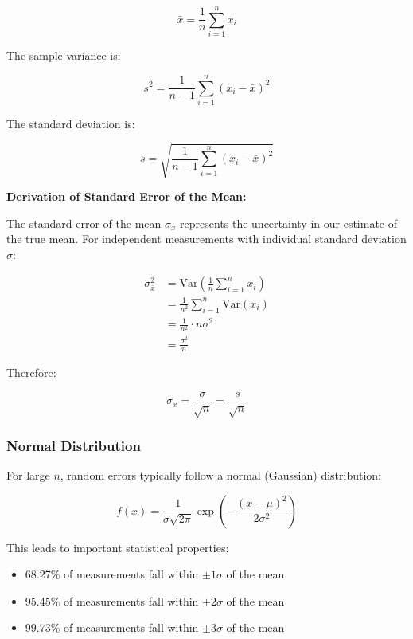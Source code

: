 \documentclass[twoside]{book}
\begin{document}
\begin{equation}
\bar{x} = \frac{1}{n}\sum_{i=1}^{n} x_i
\end{equation}

The sample variance is:

\begin{equation}
s^2 = \frac{1}{n-1}\sum_{i=1}^{n}(x_i - \bar{x})^2
\end{equation}

The standard deviation is:

\begin{equation}
s = \sqrt{\frac{1}{n-1}\sum_{i=1}^{n}(x_i - \bar{x})^2}
\end{equation}

\textbf{Derivation of Standard Error of the Mean:}

The standard error of the mean $\sigma_{\bar{x}}$ represents the uncertainty in our estimate of the true mean. For independent measurements with individual standard deviation $\sigma$:

\begin{align}
\sigma_{\bar{x}}^2 &= \text{Var}\left(\frac{1}{n}\sum_{i=1}^{n} x_i\right) \\
&= \frac{1}{n^2}\sum_{i=1}^{n}\text{Var}(x_i) \\
&= \frac{1}{n^2} \cdot n \sigma^2 \\
&= \frac{\sigma^2}{n}
\end{align}

Therefore:

\begin{equation}
\sigma_{\bar{x}} = \frac{\sigma}{\sqrt{n}} = \frac{s}{\sqrt{n}}
\end{equation}

\subsubsection{Normal Distribution}

For large $n$, random errors typically follow a normal (Gaussian) distribution:

\begin{equation}
f(x) = \frac{1}{\sigma\sqrt{2\pi}}\exp\left(-\frac{(x-\mu)^2}{2\sigma^2}\right)
\end{equation}

This leads to important statistical properties:
\begin{itemize}
\item 68.27\% of measurements fall within $\pm 1\sigma$ of the mean
\item 95.45\% of measurements fall within $\pm 2\sigma$ of the mean
\item 99.73\% of measurements fall within $\pm 3\sigma$ of the mean
\end{itemize}
\end{document}
